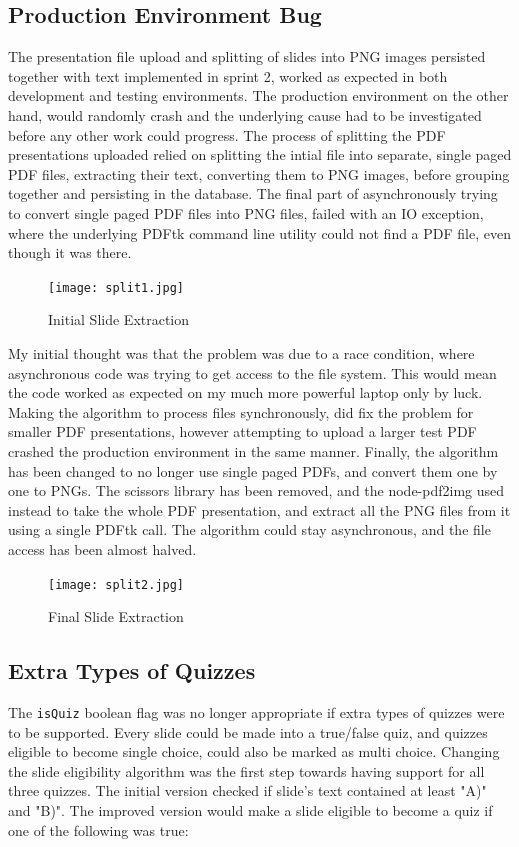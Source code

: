 \subsection{Production Environment Bug}
The presentation file upload and splitting of slides into PNG images persisted
together with text implemented in sprint 2, worked as expected in both development and testing environments.
The production environment on the other hand, would randomly crash and the underlying cause had
to be investigated before any other work could progress. The process of splitting the
PDF presentations uploaded relied on splitting the intial file into separate, single
paged PDF files, extracting their text, converting them to PNG images, before grouping
together and persisting in the database. The final part of asynchronously trying
to convert single paged PDF files into PNG files, failed with an IO exception, where
the underlying PDFtk\cite{55} command line utility could not find a PDF file, even though it was
there.

\begin{figure}[h!]
    \centering
    \texttt{[image: split1.jpg]}
    \caption{Initial Slide Extraction}
    \label{fig:split1}
\end{figure}

\newpage
My initial thought was that the problem was due to a race condition, where asynchronous
code was trying to get access to the file system. This would mean the code worked as expected
on my much more powerful laptop only by luck. Making the algorithm to process
files synchronously, did fix the problem for smaller PDF presentations, however attempting
to upload a larger test PDF crashed the production environment in the same manner.
Finally, the algorithm has been changed to no longer use single paged PDFs, and convert them
one by one to PNGs. The scissors library has been removed, and the node-pdf2img\cite{56} used
instead to take the whole PDF presentation, and extract all the PNG files from it using a
single PDFtk call. The algorithm could stay asynchronous, and the file access has been almost halved.

\begin{figure}[h!]
    \centering
    \texttt{[image: split2.jpg]}
    \caption{Final Slide Extraction}
    \label{fig:split2}
\end{figure}

\newpage
\subsection{Extra Types of Quizzes}
The \texttt{isQuiz} boolean flag was no longer appropriate if extra types of quizzes were
to be supported. Every slide could be made into a true/false quiz, and quizzes eligible
to become single choice, could also be marked as multi choice. Changing the slide eligibility
algorithm was the first step towards having support for all three quizzes. The initial version
checked if slide's text contained at least "A)" and "B)". The improved version would make a
slide eligible to become a quiz if one of the following was true:

